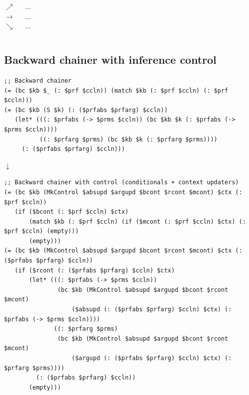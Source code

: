 \documentclass[aspectratio=169]{beamer}
\begin{document}
\begin{frame}
\begin{columns}
    \pause

    \column{1cm}
    \begin{center}
      $\nearrow$\\
      $\rightarrow$\\
      $\searrow$\\[2cm]
    \end{center}
    \vphantom{}

    \column{1cm}
    \begin{center}
      $\dots$\\
      $\dots$\\
      $\dots$\\[2cm]
    \end{center}
    \vphantom{}

  \end{columns}
\end{frame}

\subsection{Backward chainer with inference control}

\begin{frame}[fragile]
  \begin{lstlisting}
;; Backward chainer
(= (bc $kb $_ (: $prf $ccln)) (match $kb (: $prf $ccln) (: $prf $ccln)))
(= (bc $kb (S $k) (: ($prfabs $prfarg) $ccln))
   (let* (((: $prfabs (-> $prms $ccln)) (bc $kb $k (: $prfabs (-> $prms $ccln))))
          ((: $prfarg $prms) (bc $kb $k (: $prfarg $prms))))
     (: ($prfabs $prfarg) $ccln)))
  \end{lstlisting}

  \begin{center} $\downarrow$ \end{center}

  \begin{lstlisting}
;; Backward chainer with control (conditionals + context updaters)
(= (bc $kb (MkControl $absupd $argupd $bcont $rcont $mcont) $ctx (: $prf $ccln))
   (if ($bcont (: $prf $ccln) $ctx)
       (match $kb (: $prf $ccln) (if ($mcont (: $prf $ccln) $ctx) (: $prf $ccln) (empty)))
       (empty)))
(= (bc $kb (MkControl $absupd $argupd $bcont $rcont $mcont) $ctx (: ($prfabs $prfarg) $ccln))
   (if ($rcont (: ($prfabs $prfarg) $ccln) $ctx)
       (let* (((: $prfabs (-> $prms $ccln))
               (bc $kb (MkControl $absupd $argupd $bcont $rcont $mcont)
                   ($absupd (: ($prfabs $prfarg) $ccln) $ctx) (: $prfabs (-> $prms $ccln))))
              ((: $prfarg $prms)
               (bc $kb (MkControl $absupd $argupd $bcont $rcont $mcont)
                   ($argupd (: ($prfabs $prfarg) $ccln) $ctx) (: $prfarg $prms))))
         (: ($prfabs $prfarg) $ccln))
       (empty)))
  \end{lstlisting}

\end{frame}
\end{document}

